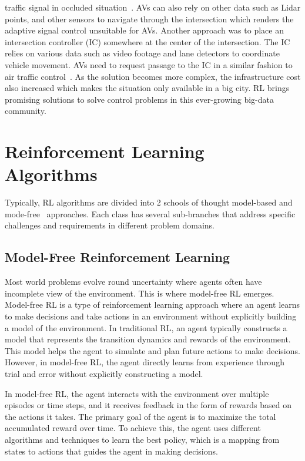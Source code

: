 traffic signal in occluded situation~\cite{Isele2017}.
AVs can also rely on
other data such as Lidar points, and other sensors to navigate
through the intersection which renders the adaptive signal
control unsuitable for AVs.
Another approach was to place an
intersection controller (IC) somewhere at the center of the
intersection.
The IC relies on various data such as video
footage and lane detectors to coordinate vehicle movement.
AVs need to request passage to the IC in a similar fashion to
air traffic control~\cite{li2021planning, gunarathna2022intelligent, qian2017autonomous, chen2019intersection}.
As the solution becomes more
complex, the infrastructure cost also increased which makes
the situation only available in a big city.
RL brings promising
solutions to solve control problems in this ever-growing big-data community.
\section{Reinforcement Learning Algorithms}\label{sec:reinforcement-learning-algorithms}

Typically, RL algorithms are divided into 2
schools of thought \textemdash model-based and mode-free~\cite{sutton2018reinforcement} approaches.
Each class has several sub-branches that address specific challenges and requirements in different problem domains.

\subsection{Model-Free Reinforcement Learning}\label{subsec:model-free-reinforcement-learning}
Most world problems evolve round uncertainty where agents often have incomplete view of the environment.
This is where model-free RL emerges.
Model-free RL is a type of reinforcement learning approach where an agent learns to make decisions and take actions in an environment without explicitly building a model of the environment. In traditional RL, an agent typically constructs a model that represents the transition dynamics and rewards of the environment. This model helps the agent to simulate and plan future actions to make decisions. However, in model-free RL, the agent directly learns from experience through trial and error without explicitly constructing a model.

In model-free RL, the agent interacts with the environment over multiple episodes or time steps, and it receives feedback in the form of rewards based on the actions it takes. The primary goal of the agent is to maximize the total accumulated reward over time. To achieve this, the agent uses different algorithms and techniques to learn the best policy, which is a mapping from states to actions that guides the agent in making decisions.

